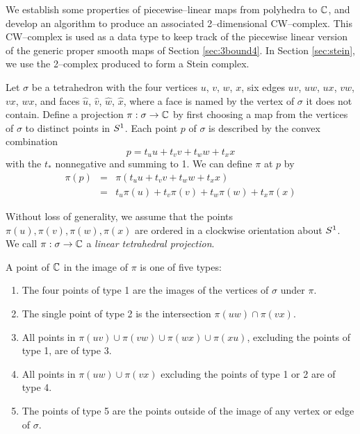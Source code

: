 We establish some properties of piecewise--linear maps from polyhedra to $\mathbb{C}$, and develop an algorithm to produce an associated 2--dimensional CW--complex.
This CW--complex is used as a data type to keep track of the piecewise linear version of the generic proper smooth maps of Section \ref{sec:3bound4}.
In Section \ref{sec:stein}, we use the 2--complex produced to form a Stein complex.

\begin{defn}
	\label{def:stdproj}
	Let $\sigma$ be a tetrahedron with the four vertices $u$, $v$, $w$, $x$, six edges $uv$, $uw$, $ux$, $vw$, $vx$, $wx$, and faces $\hat{u}$, $\hat{v}$, $\hat{w}$, $\hat{x}$, where a face is named by the vertex of $\sigma$ it does not contain.
	Define a projection $\pi: \sigma\to\mathbb{C}$ by first choosing a map from the vertices of $\sigma$ to distinct points in $S^1$.
	Each point $p$ of $\sigma$ is described by the convex combination
	\[
		p = t_u u + t_v v + t_w w + t_x x
	\]
	with the $t_*$ nonnegative and summing to 1.
	We can define $\pi$ at $p$ by
	\begin{eqnarray}
		\label{affine_extension}
		\pi(p)
		&=&
		\pi(t_u u + t_v v + t_w w + t_x x) \nonumber \\
		&=&
		t_u \pi(u) + t_v \pi(v) + t_w \pi(w) + t_x \pi(x)
	\end{eqnarray}
	  
	Without loss of generality, we assume that the points $\pi(u),\pi(v),\pi(w),\pi(x)$ are ordered in a clockwise orientation about $S^1$.
	We call $\pi:\sigma\to\mathbb{C}$ a \emph{linear tetrahedral projection}.
\end{defn}

\begin{defn}
	\label{def:projpttypes}
	A point of $\mathbb{C}$ in the image of $\pi$ is one of five types:
	\begin{enumerate}
		\item The four points of type 1 are the images of the vertices of $\sigma$ under $\pi$.
		\item The single point of type 2 is the intersection $\pi(uw)\cap\pi(vx)$.
		\item All points in $\pi(uv)\cup\pi(vw)\cup\pi(wx)\cup\pi(xu)$, excluding the points of type 1, are of type 3.
		\item All points in $\pi(uw)\cup\pi(vx)$ excluding the points of type 1 or 2 are of type 4.
		\item The points of type 5 are the points outside of the image of any vertex or edge of $\sigma$.
	\end{enumerate}
\end{defn}

